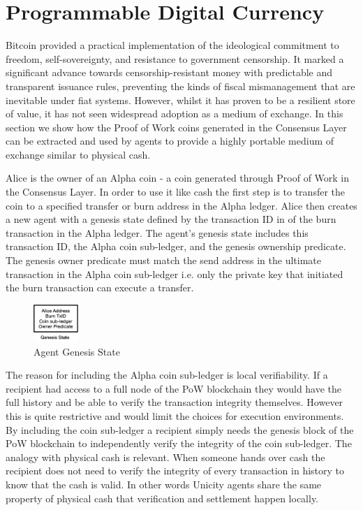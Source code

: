 \documentclass{article}
\begin{document}
\section{Programmable Digital Currency}

Bitcoin provided a practical implementation of the ideological commitment to freedom, self-sovereignty, and resistance to government censorship.  It marked a significant advance towards censorship-resistant money with predictable and transparent issuance rules, preventing the kinds of fiscal mismanagement that are inevitable under fiat systems. However, whilst it has proven to be a resilient store of value, it has not seen widespread adoption as a medium of exchange. In this section we show how the Proof of Work coins generated in the Consensus Layer can be extracted and used by agents to provide a highly portable medium of exchange similar to physical cash.

\vspace{2mm}

Alice is the owner of an Alpha coin - a coin generated through Proof of Work in the Consensus Layer. In order to use it like cash the first step is to transfer the coin to a specified transfer or burn address in the Alpha ledger. Alice then creates a new agent with a genesis state defined by the transaction ID in of the burn transaction in the Alpha ledger. The agent's genesis state includes this transaction ID, the Alpha coin sub-ledger, and the genesis ownership predicate. The genesis owner predicate must match the send address in the ultimate transaction in the Alpha coin sub-ledger i.e. only the private key that initiated the burn transaction can execute a transfer.

\begin{figure}[htbp]
    \centering
    \includegraphics[width=0.15\textwidth]{CoinGenesis.png}
    \caption{Agent Genesis State}
    \label{fig:GenesisEvent}
\end{figure}

The reason for including the Alpha coin sub-ledger is local verifiability. If a recipient had access to a full node of the PoW blockchain they would have the full history and be able to verify the transaction integrity themselves. However this is quite restrictive and would limit the choices for execution environments. By including the coin sub-ledger a recipient simply needs the genesis block of the PoW blockchain to independently verify the integrity of the coin sub-ledger. The analogy with physical cash is relevant. When someone hands over cash the recipient does not need to verify the integrity of every transaction in history to know that the cash is valid. In other words Unicity agents share the same property of physical cash that verification and settlement happen locally. 
\vspace{2mm}
\end{document}
